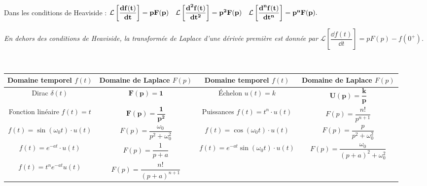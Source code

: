 \begin{resultat}[Dérivation] ~\\


\noindent Dans les conditions de Heaviside :
$\mathbf{\mathcal{L}\left[ \dfrac{\text{\textbf{d}} f(t)}{\text{\textbf{d}} t}\right] =pF(p) 
 \quad
\mathcal{L}\left[ \dfrac{\text{\textbf{d}}^2f(t)}{\text{\textbf{d}} t^2}\right] =p^2F(p) 
 \quad
\mathcal{L}\left[ \dfrac{\text{\textbf{d}}^nf(t)}{\text{\textbf{d}} t^n}\right] =p^nF(p) }.$

\noindent\textit{\footnotesize{En dehors des conditions de Heaviside, la transformée de Laplace d'une dérivée première est donnée par $\mathcal{L}\left[ \dfrac{\dd f(t)}{\dd t}\right] =pF(p)-f(0^+)$.}}


\end{resultat}


\begin{defi} ~\\
\footnotesize{

\begin{center}
\begin{tabular}{|c|c||c|c|}
\hline
Domaine temporel $f(t)$ & Domaine de Laplace $F(p)$ & 
Domaine temporel $f(t)$ & Domaine de Laplace $F(p)$ \\
\hline
\hline
Dirac $\delta(t)$ &
$\mathbf{F(p)=1}$ &
Échelon $ u(t)=k $&
$ \mathbf{U(p) = \dfrac{k}{p}}$
\\
\hline
Fonction linéaire $f(t)=t$& 
$\mathbf{F(p) =\dfrac{1}{p^2} }$ &
Puissances
$f(t) = t^n\cdot u(t)$ &
$F(p)=\dfrac{n!}{p^{n+1}} $
\\
\hline
$f(t) = \sin \left( \omega_0 t\right) \cdot u(t)$ &
$F(p) = \dfrac{\omega_0}{p^2+\omega_0^2} $ &
$f(t) = \cos \left( \omega_0 t\right) \cdot u(t)$ & 
$F(p) = \dfrac{p}{p^2+\omega_0^2} $ \\
\hline
$f(t)= e^{-at}\cdot u(t)$ & 
$F(p)= \dfrac{1}{p+a}$ &
$f(t) = e^{-at}\sin\left( \omega_0 t\right) \cdot u(t)$ &
$F(p)=\dfrac{\omega_0}{\left( p+a\right)^2 + \omega_0^2}$  \\
\hline
$f(t)=t^ne^{-at}u(t)$ & $F(p)=\dfrac{n!}{\left( p+a\right)^{n+1}}$
& &
\\
\hline
\end{tabular}
\end{center}}
\end{defi}



